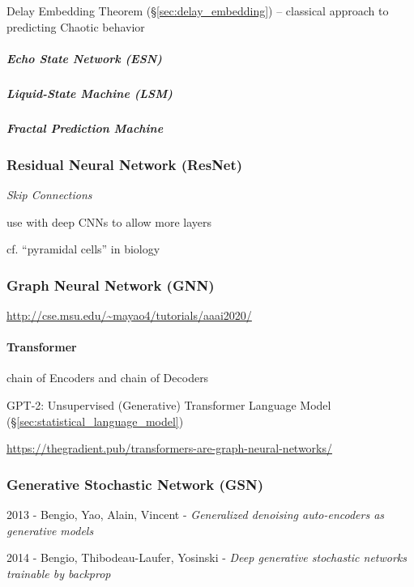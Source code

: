 Delay Embedding Theorem (\S\ref{sec:delay_embedding}) -- classical approach to
predicting Chaotic behavior



\subparagraph{Echo State Network (ESN)}\label{sec:esn}\hfill

\subparagraph{Liquid-State Machine (LSM)}\label{sec:liquid_state}\hfill

\subparagraph{Fractal Prediction Machine}
\label{sec:fractal_prediction_machine}\hfill



\subsubsection{Residual Neural Network (ResNet)}\label{sec:resnet}

\emph{Skip Connections}

use with deep CNNs to allow more layers

cf. ``pyramidal cells'' in biology



\subsubsection{Graph Neural Network (GNN)}\label{sec:gnn}

\url{http://cse.msu.edu/~mayao4/tutorials/aaai2020/}



\paragraph{Transformer}\label{sec:transformer}\hfill

chain of Encoders and chain of Decoders

GPT-2: Unsupervised (Generative) Transformer Language Model
(\S\ref{sec:statistical_language_model})

\url{https://thegradient.pub/transformers-are-graph-neural-networks/}



\subsubsection{Generative Stochastic Network (GSN)}\label{sec:gsn}

2013 - Bengio, Yao, Alain, Vincent -
\emph{Generalized denoising auto-encoders as generative models}

2014 - Bengio, Thibodeau-Laufer, Yosinski -
\emph{Deep generative stochastic networks trainable by backprop}

